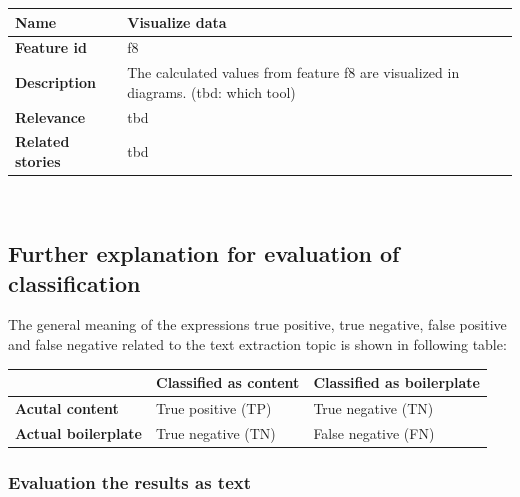 
	\begin{tabular}{ | p{3cm} | p{12cm} |}
	\hline
	\textbf{Name} 				& Visualize data \\ \hline
	\textbf{Feature id} 		& f8 \\ \hline
	\textbf{Description} 		& The calculated values from feature f8 are visualized in diagrams. (tbd: which tool)\\ \hline
	\textbf{Relevance} 			& tbd\\ \hline
	\textbf{Related stories} 	& tbd \\ \hline
	\end{tabular} \\


\subsection{Further explanation for evaluation of classification}
\label{subsec:Further explanation for evaluation of classification}


The general meaning of the expressions true positive, true negative, false positive and false negative related to the text extraction topic is shown in following table:

\begin{table}[h]
\begin{tabular}{|p{4cm} |p{5cm} |p{5cm} |}\hline
          								& \textbf{Classified as content} 	& \textbf{Classified as boilerplate} 	\\ \hline
\textbf{Acutal content} 				& True positive (TP)				& True negative (TN)					\\ \hline
\textbf{Actual boilerplate} 			& True negative (TN)       			& False negative (FN)				 	\\ \hline
\end{tabular}
\end{table}


\subsubsection{Evaluation the results as text}

